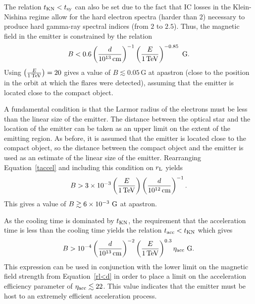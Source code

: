 \documentclass[preprint2]{aastex}
\begin{document}
The relation $t_{\mbox{\scriptsize{KN}}} < t_{\mbox{\scriptsize{sy}}}$ can also be set due to the fact that IC losses in the Klein-Nishina regime allow for the hard electron spectra (harder than $2$) necessary to produce hard gamma-ray spectral indices (from $2$ to $2.5$). Thus, the magnetic field in the emitter is constrained by the relation
\begin{equation}
{B < 0.6 \left( \frac{d}{10^{13}\mbox{\,cm}} \right)^{-1} \left( \frac{E}{1\mbox{\,TeV}} \right)^{-0.85} \,\mbox{\,G}}.
\end{equation}
Using $ \left( \frac{E}{1\mbox{\,\scriptsize TeV}} \right) = 20$ gives a value of %
$B \lesssim 0.05$\,G at apastron (close to the position in the orbit at which the flares were detected), assuming that the emitter is located close to the compact object.

A fundamental condition is that the Larmor radius of the electrons must be less than the linear size of the emitter. The distance between the optical star and the location of the emitter can be taken as an upper limit on the extent of the emitting region. As before, it is assumed that the emitter is located close to the compact object, so the distance between the compact object and the emitter is used as an estimate of the linear size of the emitter. Rearranging Equation~\ref{taccel} and including this condition on $r_{\mbox{\scriptsize{L}}}$ yields
\begin{equation}
B > 3 \times 10^{-3} \left( \frac{E}{1\mbox{\,TeV}} \right) \left( \frac{d}{10^{12}\mbox{\,cm}} \right)^{-1}.
\label{rl<d}
\end{equation}
This gives a value of %
$B \gtrsim 6 \times 10^{-3} \,\mbox{\,G}$ at apastron.

As the cooling time is dominated by $t_{\mbox{\scriptsize{KN}}}$, the requirement that the acceleration time is less than the cooling time yields the relation $t_{\mbox{\scriptsize{acc}}} < t_{\mbox{\scriptsize{KN}}}$ which gives
\begin{equation}
B > 10^{-4} \left( \frac{d}{10^{13}\mbox{\,cm}} \right)^{-2} \left( \frac{E}{1\mbox{\,TeV}} \right)^{0.3} \eta_{\mbox{\scriptsize{acc}}} \,\mbox{\,G}.
\end{equation}
This expression can be used in conjunction with the lower limit on the magnetic field strength from Equation~\ref{rl<d} in order to place a limit on the acceleration efficiency parameter of $\eta_{\mbox{\scriptsize{acc}}} \lesssim 22$. This value indicates that the emitter must be host to an extremely efficient acceleration process. 
\end{document}
